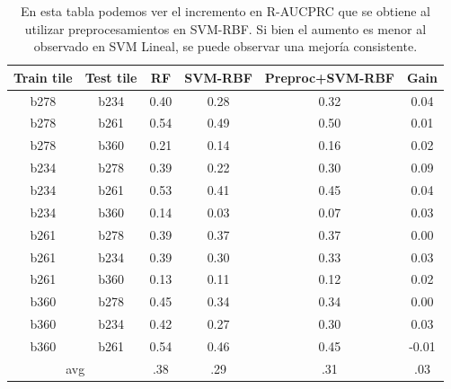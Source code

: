 \begin{table}[h!]
\centering
\begin{tabular}{|c|c|c|c|c|c|}
\hline
\textbf{Train tile} & \textbf{Test tile} & \textbf{RF} & \textbf{SVM-RBF} & \textbf{Preproc+SVM-RBF} & \textbf{Gain}              \\ \hline
b278                & b234               & 0.40        & 0.28             & 0.32                     & 0.04                       \\ \hline
b278                & b261               & 0.54        & 0.49             & 0.50                     & 0.01                       \\ \hline
b278                & b360               & 0.21        & 0.14             & 0.16                     & 0.02                       \\ \hline
b234                & b278               & 0.39        & 0.22             & 0.30                     & 0.09                       \\ \hline
b234                & b261               & 0.53        & 0.41             & 0.45                     & 0.04                       \\ \hline
b234                & b360               & 0.14        & 0.03             & 0.07                     & 0.03                       \\ \hline
b261                & b278               & 0.39        & 0.37             & 0.37                     & 0.00                       \\ \hline
b261                & b234               & 0.39        & 0.30             & 0.33                     & 0.03                       \\ \hline
b261                & b360               & 0.13        & 0.11             & 0.12                     & 0.02                       \\ \hline
b360                & b278               & 0.45        & 0.34             & 0.34                     & 0.00                       \\ \hline
b360                & b234               & 0.42        & 0.27             & 0.30                     & 0.03                       \\ \hline
b360                & b261               & 0.54        & 0.46             & 0.45                     & -0.01                      \\ \hline
\multicolumn{2}{|c|}{avg}                & .38         & .29              & .31                      & {\color[HTML]{009901} .03} \\ \hline
\end{tabular}
\caption{ En esta tabla podemos ver el incremento en R-AUCPRC que se obtiene al utilizar preprocesamientos en SVM-RBF. Si bien el aumento es menor al observado en SVM Lineal, se puede observar una mejoría consistente. }
\label{tab:rbf-gain-preproc}
\end{table}